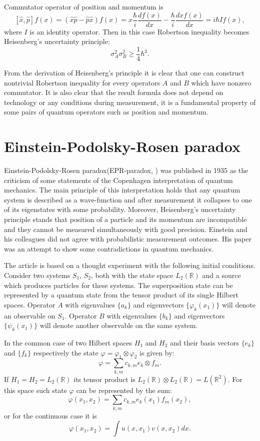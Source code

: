 \documentclass[11pt]{article}
\begin{document}
Commutator operator of position and momentum is 
\[
[\hat{x}, \hat{p}]f(x) = (\hat{x}\hat{p} - \hat{p}\hat{x})f(x) = x\frac{\hbar}{i}\frac{df(x)}{dx} - \frac{\hbar}{i}\frac{d xf(x)}{dx} = i\hbar If(x),
\]
where $I$ is an identity operator. Then in this case Robertson inequality becomes Heisenberg's uncertainty principle:
\[
\sigma_A^2\sigma_B^2 \geq \frac{1}{4}\hbar^2.
\]

From the derivation of Heisenberg's principle it is clear that one can construct nontrivial Robertson inequality for every operators $A$ and $B$ which have nonzero commutator. It is also clear that the result formula does not depend on technology or any conditions during measurement, it is a fundamental property of some pairs of quantum operators such as position and momentum.

\section{Einstein-Podolsky-Rosen paradox}
Einstein-Podolsky-Rosen paradox(EPR-paradox, \cite{EPR}) was published in 1935 as the criticism of some statements of the Copenhagen interpretation of quantum mechanics. The main principle of this interpretation holds that any quantum system is described as a wave-function and after measurement it collapses to one of its eigenstates with some probability. Moreover, Heisenberg's uncertainty principle stands that position of a particle and its momentum are incompatible and they cannot be measured simultaneously with good precision. Einstein and his colleagues did not agree with probabilistic measurement outcomes. His paper was an attempt to show some contradictions in quantum mechanics.

The article \cite{EPR} is based on a thought experiment with the following initial conditions. Consider two systems $S_1$, $S_2$, both with the state space $L_2(\mathbb{R})$ and a source which produces particles for these systems. The superposition state can be represented by a quantum state from the tensor product of its single Hilbert spaces.
Operator $A$ with eigenvalues $\{a_k\}$ and eigenvectors $\{\varphi_k(x_1)\}$ will denote an observable on $S_1$. Operator $B$  with eigenvalues $\{b_k\}$ and eigenvectors $\{\psi_k(x_1)\}$ will denote another observable on the same system. 

In the common case of two Hilbert spaces $H_1$ and $H_2$ and their basis vectors $\{e_k\}$ and $\{f_k\}$ respectively the state $\varphi = \varphi_1\otimes\varphi_2$ is given by:
\[
\varphi = \sum_{k, m}c_{k, m}e_k\otimes f_m.
\]
If $H_1 = H_2 = L_2(\mathbb{R})$ its tensor product is $L_2(\mathbb{R})\otimes L_2(\mathbb{R}) = L(\mathbb{R}^2)$. For this space such state $\varphi$ can be represented by the sum:
\[
\varphi (x_1, x_2) = \sum_{k, m}c_{k, m}e_k(x_1)f_m(x_2),
\]
or for the continuous case it is
\[
\varphi (x_1, x_2) = \int u(x, x_1)v(x, x_2)dx.
\]
\end{document}
